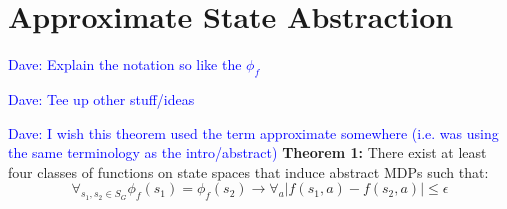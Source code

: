 \documentclass{article}
\newcommand\dnote[1]{\textcolor{blue}{Dave: #1}}
\begin{document}



%


\section{Approximate State Abstraction}



\dnote{Explain the notation so like the $\phi_f$}

\dnote{Tee up other stuff/ideas}


\dnote{I wish this theorem used the term approximate somewhere (i.e. was using the same terminology as the intro/abstract)}
{\bf Theorem 1:} There exist at least four classes of functions on state spaces that induce abstract MDPs such that:
\begin{equation}
\forall_{s_1, s_2 \in S_G} \phi_f(s_1) = \phi_f(s_2) \rightarrow \forall_a  |f(s_1,a) - f(s_2,a)| \leq \epsilon
\end{equation}
\end{document}
